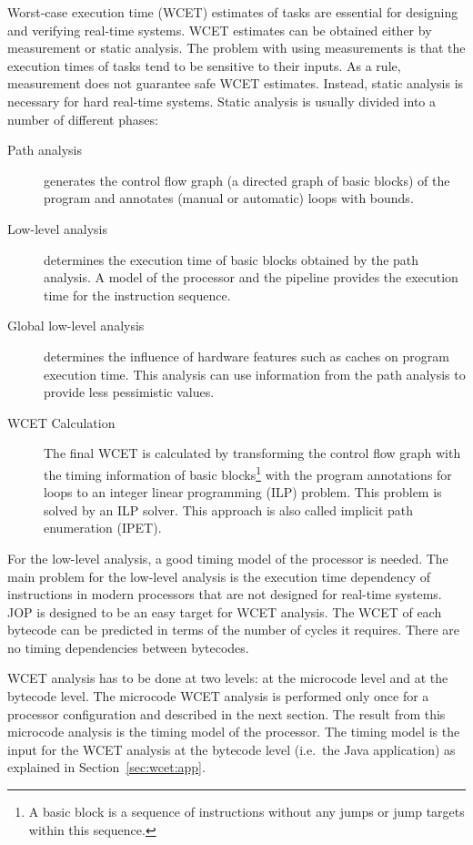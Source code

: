 

Worst-case execution time (WCET) estimates of tasks are essential for
designing and verifying real-time systems. WCET estimates can be
obtained either by measurement or static analysis. The problem with
using measurements is that the execution times of tasks tend to be
sensitive to their inputs. As a rule, measurement does not guarantee
safe WCET estimates. Instead, static analysis is necessary for hard
real-time systems. Static analysis is usually divided into a number
of different phases:
\begin{description}
    \item[Path analysis] generates the control flow graph (a directed
    graph of basic blocks) of the program and annotates (manual or
    automatic) loops with bounds.
    \item[Low-level analysis] determines the execution time of basic
    blocks obtained by the path analysis. A model of the processor
    and the pipeline provides the execution time for the instruction
    sequence.
    \item[Global low-level analysis] determines the influence of
    hardware features such as caches on program execution time. This
    analysis can use information from the path analysis to provide less
    pessimistic values.
    \item[WCET Calculation] The final WCET is calculated by
        transforming the control flow graph with the timing
        information of basic blocks\footnote{A basic block is a
        sequence of instructions without any jumps or jump
        targets within this sequence.} with the program
        annotations for loops to an integer linear programming
        (ILP) problem. This problem is solved by an ILP solver.
        This approach is also called implicit path enumeration
        (IPET).
\end{description}

For the low-level analysis, a good timing model of the processor is
needed. The main problem for the low-level analysis is the execution
time dependency of instructions in modern processors that are not
designed for real-time systems. JOP is designed to be an easy target
for WCET analysis. The WCET of each bytecode can be predicted in
terms of the number of cycles it requires. There are no timing
dependencies between bytecodes.

WCET analysis has to be done at two levels: at the microcode level
and at the bytecode level. The microcode WCET analysis is performed
only once for a processor configuration and described in the next
section. The result from this microcode analysis is the timing model
of the  processor. The timing model is the input for the WCET
analysis at the bytecode level (i.e.\ the Java application) as
explained in Section~\ref{sec:wcet:app}.

